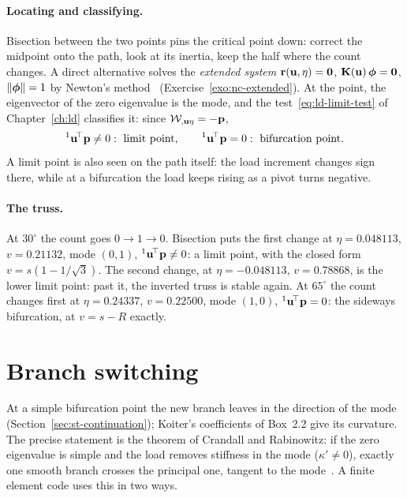\paragraph{Locating and classifying.}
Bisection between the two points pins the critical point down: correct the midpoint onto
the path, look at its inertia, keep the half where the count changes. A direct alternative
solves the \emph{extended system} $\mathbf{r}(\mathbf{u},\eta) = \mathbf{0}$,
$\mathbf{K}(\mathbf{u})\,\boldsymbol{\phi} = \mathbf{0}$, $\lVert \boldsymbol{\phi}\rVert = 1$ by Newton's
method~\cite{nc-wriggers1990} (Exercise~\ref{exo:nc-extended}). At the point, the
eigenvector of the zero eigenvalue is the mode, and the test~\eqref{eq:ld-limit-test} of
Chapter~\ref{ch:ld} classifies it: since $\mathcal{W}_{,\mathbf{u}\eta} = -\mathbf{p}$,
\begin{equation}\label{eq:nc-classify}
  {}^1\mathbf{u}^{\!\top}\mathbf{p} \neq 0: \text{ limit point},
  \qquad
  {}^1\mathbf{u}^{\!\top}\mathbf{p} = 0: \text{ bifurcation point}.
\end{equation}
A limit point is also seen on the path itself: the load increment changes sign there,
while at a bifurcation the load keeps rising as a pivot turns negative.

\paragraph{The truss.}
At $30^\circ$ the count goes $0 \to 1 \to 0$. Bisection puts the first change at
$\eta = 0.048113$, $v = 0.21132$, mode $(0,1)$, ${}^1\mathbf{u}^{\!\top}\mathbf{p} \neq 0$: a limit point,
with the closed form $v = s(1 - 1/\sqrt3)$. The second change, at $\eta = -0.048113$,
$v = 0.78868$, is the lower limit point: past it, the inverted truss is stable again. At
$65^\circ$ the count changes first at $\eta = 0.24337$, $v = 0.22500$, mode $(1,0)$,
${}^1\mathbf{u}^{\!\top}\mathbf{p} = 0$: the sideways bifurcation, at $v = s - R$ exactly.

\section{Branch switching}\label{sec:nc-switch}
%

At a simple bifurcation point the new branch leaves in the direction of the mode
(Section~\ref{sec:st-continuation}); Koiter's coefficients of Box~2.2 give its curvature. The
precise statement is the theorem of Crandall and Rabinowitz: if the zero eigenvalue is simple and
the load removes stiffness in the mode ($\kappa' \neq 0$), exactly one smooth branch crosses the
principal one, tangent to the mode~\cite[Sections~I.5--I.7]{nc-kielhofer2004}.
A finite element code uses this in two ways.

